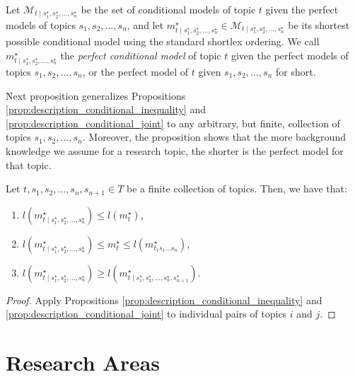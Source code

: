 \begin{definition}
Let $\mathcal{M}_{t \mid s_1^\star, s_2^\star, \ldots, s_n^\star}$ be the set of conditional models of topic $t$ given the perfect models of topics $s_1, s_2, \ldots, s_n$, and let $m_{t \mid s_1^\star, s_2^\star, \ldots, s_n^\star}^\star \in \mathcal{M}_{t \mid s_1^\star, s_2^\star, \ldots, s_n^\star}$ be its shortest possible conditional model using the standard shortlex ordering. We call $m_{t \mid s_1^\star, s_2^\star, \ldots, s_n^\star}^\star$ the \emph{perfect conditional model} of topic $t$ given the perfect models of topics $s_1, s_2, \ldots, s_n$, or the perfect model of $t$ given $s_1, s_2, \ldots, s_n$ for short.
\end{definition}

Next proposition generalizes Propositions \ref{prop:description_conditional_inequality} and \ref{prop:description_conditional_joint} to any arbitrary, but finite, collection of topics $s_1, s_2, \ldots, s_n$. Moreover, the proposition shows that the more background knowledge we assume for a research topic, the shorter is the perfect model for that topic.

\begin{proposition}
\label{prop:joint_multiple_topics}
Let $t, s_1, s_2, \ldots, s_n, s_{n+1} \in T$ be a finite collection of topics. Then, we have that:

\renewcommand{\theenumi}{\roman{enumi}}
\begin{enumerate}
\item $l \left( m_{t \mid s_1^\star, s_2^\star, \ldots, s_n^\star}^\star \right) \leq l \left( m^\star_t \right)$,
\item $l \left( m_{t \mid s_1^\star, s_2^\star, \ldots, s_n^\star}^\star \right) \leq m_t^\star \leq l(m_{t_1 s_1 \ldots s_n}^\star)$,
\item $l \left( m_{t \mid s_1^\star, s_2^\star, \ldots, s_n^\star}^\star \right) \geq l \left( m_{t \mid s_1^\star, s_2^\star, \ldots, s_n^\star, s_{n+1}^\star}^\star \right)$.
\end{enumerate}
\end{proposition}
\begin{proof}
Apply Propositions \ref{prop:description_conditional_inequality} and \ref{prop:description_conditional_joint} to individual pairs of topics $i$ and $j$.
\end{proof}


%
%

\section{Research Areas}
\label{sec:areas}

